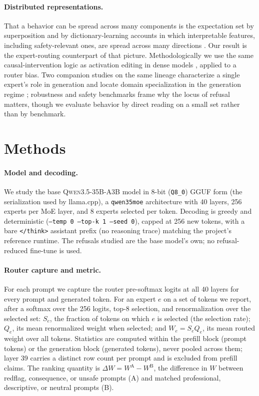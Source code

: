 \documentclass[10pt,twocolumn]{article}
\begin{document}
\paragraph{Distributed representations.}
That a behavior can be spread across many components is the expectation set by
superposition \citep{elhage2022superposition} and by dictionary-learning
accounts in which interpretable features, including safety-relevant ones,
are spread across many directions
\citep{bricken2023monosemanticity,templeton2024scaling}. Our result is the
expert-routing counterpart of that picture. Methodologically we use the same
causal-intervention logic as activation editing in dense models
\citep{meng2022locating}, applied to a router bias. Two companion studies on
the same lineage characterize a single expert's role in generation
\citep{shorthill2026e114} and locate domain specialization in the generation
regime \citep{shorthill2026generation}; robustness and safety benchmarks
\citep{mazeika2024harmbench,wei2023jailbroken} frame why the locus of refusal
matters, though we evaluate behavior by direct reading on a small set rather
than by benchmark.

\section{Methods}
\label{sec:methods}

\paragraph{Model and decoding.}
We study the base \textsc{Qwen3.5-35B-A3B} model in 8-bit (\texttt{Q8\_0})
GGUF form (the serialization used by llama.cpp), a \texttt{qwen35moe}
architecture with 40 layers, 256 experts per MoE layer, and 8 experts
selected per token. Decoding is greedy and deterministic
(\texttt{--temp 0 --top-k 1 --seed 0}), capped at 256 new tokens, with a bare
\texttt{</think>} assistant prefix (no reasoning trace) matching the
project's reference runtime. The refusals studied are the base model's own;
no refusal-reduced fine-tune is used.

\paragraph{Router capture and metric.}
For each prompt we capture the router pre-softmax logits at all 40 layers for
every prompt and generated token. For an expert $e$ on a set of tokens we
report, after a softmax over the 256 logits, top-8 selection, and
renormalization over the selected set: $S_e$, the fraction of tokens on which
$e$ is selected (the selection rate); $Q_e$, its mean renormalized weight when
selected; and $W_e=S_eQ_e$, its mean routed weight over all tokens.
Statistics are computed within the prefill block (prompt tokens) or the
generation block (generated tokens), never pooled across them; layer 39
carries a distinct row count per prompt and is excluded from prefill claims.
The ranking quantity is $\Delta W=W^{\mathrm{A}}-W^{\mathrm{B}}$, the
difference in $W$ between redflag, consequence, or unsafe prompts (A) and
matched professional, descriptive, or neutral prompts (B).
\end{document}

